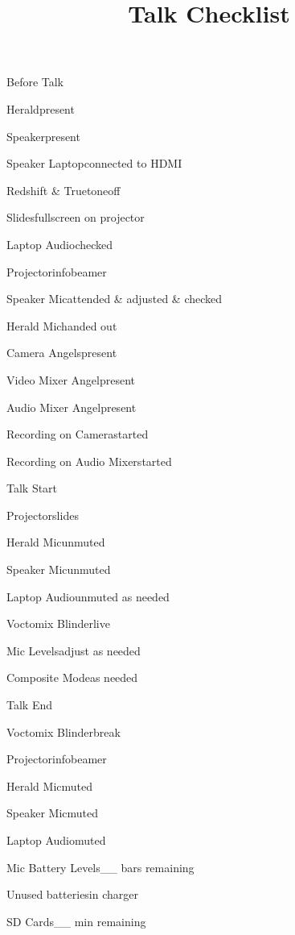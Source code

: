 \def\papersize{5}




\title{Talk Checklist}

\begin{checklist}{Before Talk}
  \item{Herald}{present}
  \item{Speaker}{present}
  \item{Speaker Laptop}{connected to HDMI}
  \item{Redshift \& Truetone}{off}
  \item{Slides}{fullscreen on projector}
  \item{Laptop Audio}{checked}
  \item{Projector}{infobeamer}
  \item{Speaker Mic}{attended \& adjusted \& checked}
  \item{Herald Mic}{handed out}
  \item{Camera Angels}{present}
  \item{Video Mixer Angel}{present}
  \item{Audio Mixer Angel}{present}
  \item{Recording on Camera}{started}
  \item{Recording on Audio Mixer}{started}
\end{checklist}

\begin{checklist}{Talk Start}
  \item{Projector}{slides}
  \item{Herald Mic}{unmuted}
  \item{Speaker Mic}{unmuted}
  \item{Laptop Audio}{unmuted as needed}
  \item{Voctomix Blinder}{live}
  \item{Mic Levels}{adjust as needed}

  \item{Composite Mode}{as needed}
\end{checklist}

\begin{checklist}{Talk End}
  \item{Voctomix Blinder}{break}
  \item{Projector}{infobeamer}
  \item{Herald Mic}{muted}
  \item{Speaker Mic}{muted}
  \item{Laptop Audio}{muted}
  \item{Mic Battery Levels}{\_\_ bars remaining}
  \item{Unused batteries}{in charger}

  \item{SD Cards}{\_\_ min remaining}
\end{checklist}



